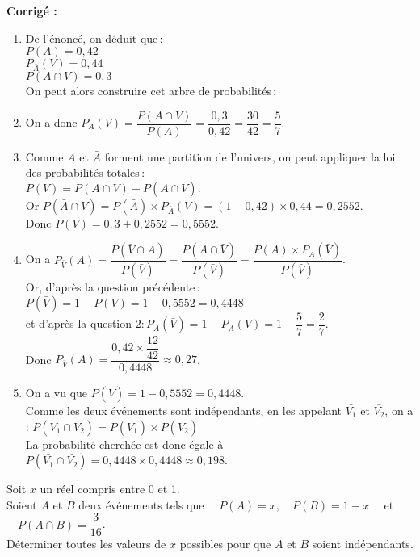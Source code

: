\documentclass[a4paper,11pt,exos]{nsi} %
\begin{document}
\textcolor{UGLiBlue}{
    \textbf{Corrigé :}
\begin{enumerate}
    \item De l'énoncé, on déduit que\,:\\ $P(A)=0{,}42$\\ $P_{\bar{A}}(V)=0{,}44$\\ $P(A \cap V)=0{,}3$\\On peut alors construire cet arbre de probabilités\,:
    \def\abun{$A$}
    \def\alun{0,42}
    \def\abdeux{$\barmaj{A}$}
    \def\aldeux{0,58}
    \def\abtrois{$V$}
    \def\altrois{}
    \def\abquatre{$\barmaj{V}$}
    \def\alquatre{}
    \def\abcinq{$V$}
    \def\alcinq{0,44}
    \def\absix{$\barmaj{V}$}
    \def\alsix{0,56}
    \begin{center}
        \arbreproba
    \end{center}
    \item On a donc $P_{A}(V)=\dfrac{P(A \cap V)}{P(A)}=\dfrac{0{,}3}{0{,}42}=\dfrac{30}{42}=\dfrac{5}{7} $.
    \item Comme $A$ et $\bar A$ forment une partition de l'univers, on peut appliquer la loi des probabilités totales\,: \\$P(V)=P(A \cap V)+P(\bar{A} \cap V). $\\Or $P(\bar{A} \cap V)=P(\bar{A}) \times P_{\bar{A}}(V)=(1-0{,}42) \times 0{,}44=0{,}2552$.\\Donc $P(V)=0{,}3+0{,}2552=0{,}5552$.
    \item On a $P_{\bar{V}}(A)=\dfrac{P(\bar{V} \cap A)}{P(\bar{V})}=\dfrac{P(A \cap \bar{V})}{P(\bar{V})}=\dfrac{P(A) \times P_A(\bar{V})}{P(\bar{V})}$.\\Or, d'après la question précédente\,:\,$P(\bar{V})=1-P(V)=1-0{,}5552=0{,}4448$\\et d'après la question $2: P_{A}(\bar{V})=1-P_{A}(V)=1-\dfrac{5}{7}=\dfrac{2}{7}$.\\Donc $P_{\bar{V}}(A)=\dfrac{0{,}42 \times \dfrac{12}{42}}{0{,}4448} \approx0{,}27$.
    \item On a vu que $P(\bar{V})=1-0{,}5552=0{,}4448$.\\Comme les deux événements sont indépendants, en les appelant $\bar {V_1}$ et $\bar{V_2}$, on a : $P(\bar{V_1}\cap\bar{V_2})=P(\bar{V_1})\times P(\bar{V_2})$\\La probabilité cherchée est donc égale à $P(\bar{V_1}\cap\bar{V_2})=0{,}4448 \times 0{,}4448\approx0{,}198$.
\end{enumerate}
}


\exo{}
Soit $x$ un réel compris entre 0 et 1.\\
Soient $A$ et $B$ deux événements tels que $\quad P(A)=x, \quad P(B)=1-x\quad$ et $\quad P(A \cap B)=\dfrac{3}{16}$.\\[.5em]
Déterminer toutes les valeurs de $x$ possibles pour que $A$ et $B$ soient indépendants.\\
\end{document}
